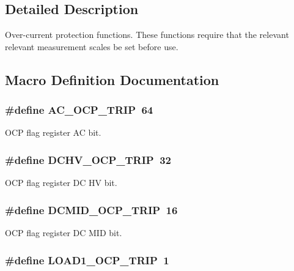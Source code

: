 \subsection{Detailed Description}
Over-\/current protection functions. These functions require that the relevant relevant measurement scales be set before use. 

\subsection{Macro Definition Documentation}
\hypertarget{a00030_a53e3b040fd854d92e865a4e59f1630a2}{
\subsubsection[{A\-C\-\_\-\-O\-C\-P\-\_\-\-T\-R\-I\-P}]{\setlength{\rightskip}{0pt plus 5cm}\#define A\-C\-\_\-\-O\-C\-P\-\_\-\-T\-R\-I\-P~64}}\label{a00030_a53e3b040fd854d92e865a4e59f1630a2}
O\-C\-P flag register A\-C bit. \hypertarget{a00030_a79277b6c4861afbef292e26f4360b224}{
\subsubsection[{D\-C\-H\-V\-\_\-\-O\-C\-P\-\_\-\-T\-R\-I\-P}]{\setlength{\rightskip}{0pt plus 5cm}\#define D\-C\-H\-V\-\_\-\-O\-C\-P\-\_\-\-T\-R\-I\-P~32}}\label{a00030_a79277b6c4861afbef292e26f4360b224}
O\-C\-P flag register D\-C H\-V bit. \hypertarget{a00030_ad4ef44d1890a81d34d453203c204384a}{
\subsubsection[{D\-C\-M\-I\-D\-\_\-\-O\-C\-P\-\_\-\-T\-R\-I\-P}]{\setlength{\rightskip}{0pt plus 5cm}\#define D\-C\-M\-I\-D\-\_\-\-O\-C\-P\-\_\-\-T\-R\-I\-P~16}}\label{a00030_ad4ef44d1890a81d34d453203c204384a}
O\-C\-P flag register D\-C M\-I\-D bit. \hypertarget{a00030_a4ec4aa0e60bea1a3e34167b2571a65de}{
\subsubsection[{L\-O\-A\-D1\-\_\-\-O\-C\-P\-\_\-\-T\-R\-I\-P}]{\setlength{\rightskip}{0pt plus 5cm}\#define L\-O\-A\-D1\-\_\-\-O\-C\-P\-\_\-\-T\-R\-I\-P~1}}\label{a00030_a4ec4aa0e60bea1a3e34167b2571a65de}
